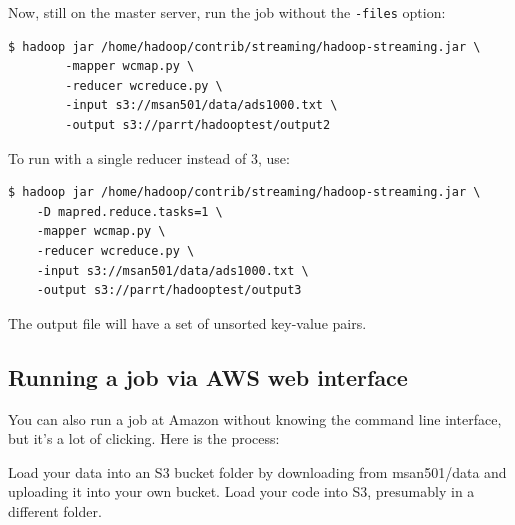 \begin{fullwidth}
\noindent Now, still on the master server, run the job without the {\tt -files} option:

\begin{lstlisting}[style=BashInputStyle]
$ hadoop jar /home/hadoop/contrib/streaming/hadoop-streaming.jar \
    	-mapper wcmap.py \
    	-reducer wcreduce.py \
    	-input s3://msan501/data/ads1000.txt \
    	-output s3://parrt/hadooptest/output2
\end{lstlisting}

\noindent To run with a single reducer instead of 3, use:

\begin{lstlisting}[style=BashInputStyle]
$ hadoop jar /home/hadoop/contrib/streaming/hadoop-streaming.jar \
    -D mapred.reduce.tasks=1 \
    -mapper wcmap.py \
    -reducer wcreduce.py \
    -input s3://msan501/data/ads1000.txt \
    -output s3://parrt/hadooptest/output3
\end{lstlisting}

 The output file will have a set of unsorted key-value pairs.

\subsection{Running a job via AWS web interface}

You can also run a job at Amazon without knowing the command line interface, but it's a lot of clicking. Here is the process:

\step Load your data into an S3 bucket folder by downloading from msan501/data and uploading it into your own bucket. Load your code into S3, presumably in a different folder.

 \hspace{20pt}


\end{fullwidth}

